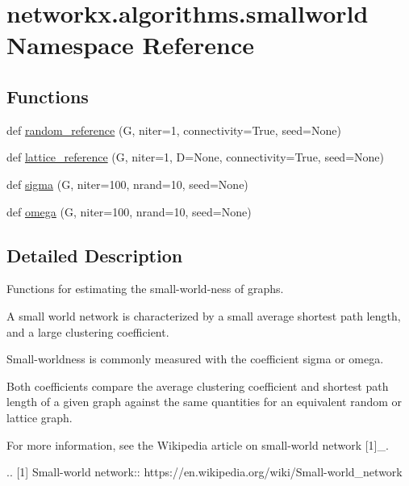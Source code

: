 \hypertarget{namespacenetworkx_1_1algorithms_1_1smallworld}{}\section{networkx.\+algorithms.\+smallworld Namespace Reference}
\label{namespacenetworkx_1_1algorithms_1_1smallworld}
\subsection*{Functions}
\begin{DoxyCompactItemize}
\item 
def \hyperlink{namespacenetworkx_1_1algorithms_1_1smallworld_a23c9e5c3fcdbc8f107bbbdddeb45ba9e}{random\+\_\+reference} (G, niter=1, connectivity=True, seed=None)
\item 
def \hyperlink{namespacenetworkx_1_1algorithms_1_1smallworld_a1ee60cf9f8bcd25f19404f14274e66a6}{lattice\+\_\+reference} (G, niter=1, D=None, connectivity=True, seed=None)
\item 
def \hyperlink{namespacenetworkx_1_1algorithms_1_1smallworld_a4bce7f8ef34970dbdbe4e20991db7b19}{sigma} (G, niter=100, nrand=10, seed=None)
\item 
def \hyperlink{namespacenetworkx_1_1algorithms_1_1smallworld_a6c56f8a4aad98862a5fd6b697961b5fc}{omega} (G, niter=100, nrand=10, seed=None)
\end{DoxyCompactItemize}


\subsection{Detailed Description}
\begin{DoxyVerb}Functions for estimating the small-world-ness of graphs.

A small world network is characterized by a small average shortest path length,
and a large clustering coefficient.

Small-worldness is commonly measured with the coefficient sigma or omega.

Both coefficients compare the average clustering coefficient and shortest path
length of a given graph against the same quantities for an equivalent random
or lattice graph.

For more information, see the Wikipedia article on small-world network [1]_.

.. [1] Small-world network:: https://en.wikipedia.org/wiki/Small-world_network\end{DoxyVerb}
 

